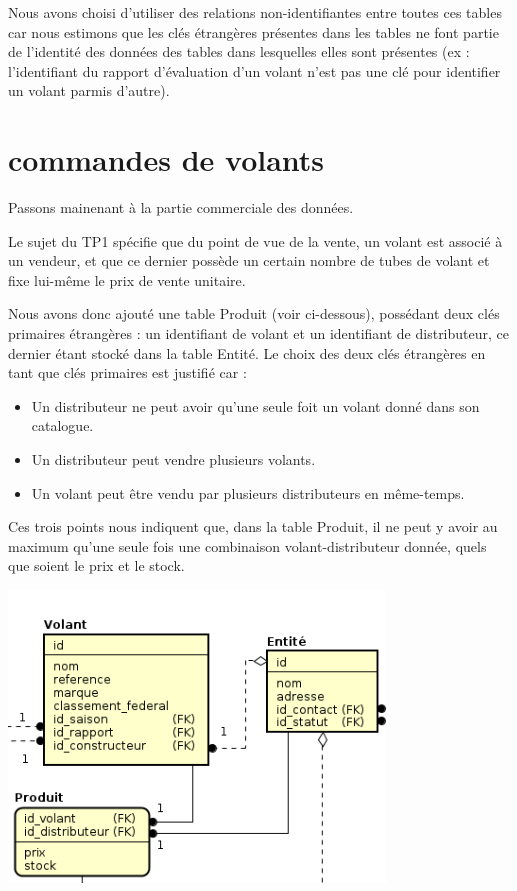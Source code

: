 \documentclass[french,a4paper,12pt]{report}
\begin{document}
Nous avons choisi d'utiliser des relations non-identifiantes entre toutes ces
tables car nous estimons que les clés étrangères présentes dans les tables ne
font partie de l'identité des données des tables dans lesquelles elles sont
présentes (ex : l'identifiant du rapport d'évaluation d'un volant n'est pas
une clé pour identifier un volant parmis d'autre).

\section{commandes de volants}
Passons mainenant à la partie commerciale des données.

Le sujet du TP1 spécifie que du point de vue de la vente, un volant est associé
à un vendeur, et que ce dernier possède un certain nombre de tubes de volant et
fixe lui-même le prix de vente unitaire.

Nous avons donc ajouté une table Produit (voir ci-dessous), possédant deux clés
primaires étrangères : un identifiant de volant et un identifiant de
distributeur, ce dernier étant stocké dans la table Entité. Le choix des deux
clés étrangères en tant que clés primaires est justifié car :
\begin{itemize}
  \item Un distributeur ne peut avoir qu'une seule foit un volant donné dans
  son catalogue.
  \item Un distributeur peut vendre plusieurs volants.
  \item Un volant peut être vendu par plusieurs distributeurs en même-temps.
\end{itemize}
Ces trois points nous indiquent que, dans la table Produit, il ne peut y avoir
au maximum qu'une seule fois une combinaison volant-distributeur donnée, quels
que soient le prix et le stock.

\includegraphics[width=10cm]{ensemble2.png}
\end{document}

